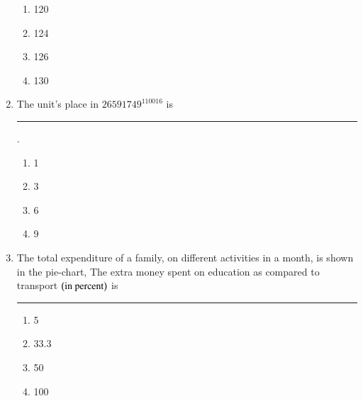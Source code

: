 \documentclass[journal]{IEEEtran}
\numberwithin{equation}{enumi}
\numberwithin{figure}{enumi}
\begin{document}
\begin{enumerate}
\begin{enumerate}
                \item 120
                \item 124
                \item 126
                \item 130
	\end{enumerate}
\item The unit's place in $26591749^{110016}$ is \rule{1cm}{0.4pt}.
	\begin{enumerate}
		\item 1
                \item 3
                \item 6
                \item 9
	\end{enumerate}
\item The total expenditure of a family, on different activities in a month, is shown in the pie-chart, The extra money spent on education as compared to transport $\left(\text{in percent}\right)$ is \rule{1cm}{0.4pt}
	\begin{enumerate}
                \item 5
                \item 33.3
                \item 50
                \item 100
        \end{enumerate}

\end{enumerate}
\end{document}
